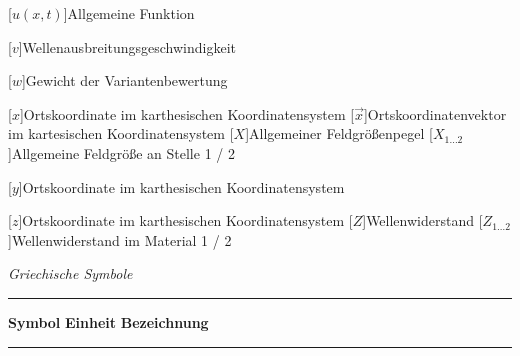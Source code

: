 \begin{acronym}[Platzhalterwort]
[$u(x,t)$]{\acrounit{-}Allgemeine Funktion}

[$v$]{\acrounit{\meter\per\second}Wellenausbreitungsgeschwindigkeit}

[$w$]{\acrounit{-}Gewicht der Variantenbewertung}

[$x$]{\acrounit{-}Ortskoordinate im karthesischen Koordinatensystem}
[$\vec x$]{\acrounit{-}Ortskoordinatenvektor im kartesischen Koordinatensystem}
[$X$]{\acrounit{\Dezibel}Allgemeiner Feldgrößenpegel}
[$X_{1\ldots2}$]{\acrounit{-}Allgemeine Feldgröße an Stelle 1 / 2}

[$y$]{\acrounit{-}Ortskoordinate im karthesischen Koordinatensystem}

[$z$]{\acrounit{-}Ortskoordinate im karthesischen Koordinatensystem}
[$Z$]{\acrounit{-}Wellenwiderstand}
[$Z_{1\ldots2}$]{\acrounit{-}Wellenwiderstand im Material 1 / 2}

\end{acronym}
\newpage



\textit{Griechische Symbole} \\[.5\linespace]
\noindent\rule{\textwidth}{0.5pt}
\textbf{Symbol} \hspace{12.5mm} \textbf{Einheit} \hspace{10.5mm} \textbf{Bezeichnung} \\[-\linespace]
\noindent\rule{\textwidth}{0.5pt}

